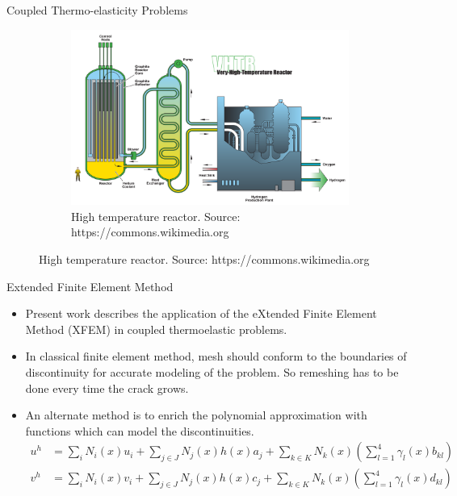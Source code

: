 \documentclass{beamer}
\begin{document}
\begin{frame}[t,fragile]{Coupled Thermo-elasticity Problems}
\begin{figure}[H]
\begin{subfigure}{0.45\textwidth}
    \centering
 \includegraphics[scale=.05]{reator.png}
 \caption{\tiny{High temperature reactor. Source: https://commons.wikimedia.org}}
 \label{2}
 \end{subfigure}
\label{fig:caption}
\end{figure}
\end{frame}
\begin{frame}[t,fragile]{Extended Finite Element Method}
    \begin{itemize}
\item Present work describes the application of the eXtended Finite Element Method (XFEM) in coupled thermoelastic problems.
\item In classical finite element method, mesh should conform to the boundaries of discontinuity for accurate modeling of the problem. So remeshing has to be done every time the crack grows. 
\item An alternate method is to enrich the polynomial approximation with functions which can model the discontinuities. 
    \footnotesize
    \begin{align*}
    u^h&=\sum_i N_i(x)u_i+\sum_{j\in J} N_j(x) h(x)a_j+\sum_{k\in K} N_k(x)\left( \sum_{l=1}^{4}\gamma_l(x)b_{kl} \right) \\
    v^h&=\sum_i N_i(x)v_i+\sum_{j\in J} N_j(x) h(x)c_j+\sum_{k\in K} N_k(x)\left( \sum_{l=1}^{4}\gamma_l(x)d_{kl} \right) 
\end{align*}
\end{itemize}
\end{frame}
\end{document}
